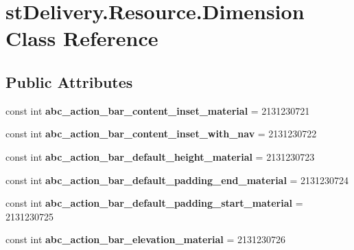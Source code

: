 \hypertarget{classst_delivery_1_1_resource_1_1_dimension}{}\section{st\+Delivery.\+Resource.\+Dimension Class Reference}
\label{classst_delivery_1_1_resource_1_1_dimension}
\subsection*{Public Attributes}
\begin{DoxyCompactItemize}
\item 
\mbox{\label{classst_delivery_1_1_resource_1_1_dimension_afbbbc7a6b7fefa2317bd42fb9382f283}} 
const int {\bfseries abc\+\_\+action\+\_\+bar\+\_\+content\+\_\+inset\+\_\+material} = 2131230721
\item 
\mbox{\label{classst_delivery_1_1_resource_1_1_dimension_a8b504eb3bcd5b40365ef4f6b5daa0acb}} 
const int {\bfseries abc\+\_\+action\+\_\+bar\+\_\+content\+\_\+inset\+\_\+with\+\_\+nav} = 2131230722
\item 
\mbox{\label{classst_delivery_1_1_resource_1_1_dimension_a805da6d1a549eac34fdc405e7fc84f34}} 
const int {\bfseries abc\+\_\+action\+\_\+bar\+\_\+default\+\_\+height\+\_\+material} = 2131230723
\item 
\mbox{\label{classst_delivery_1_1_resource_1_1_dimension_a496b13f8b3fff885f988d71196390f7c}} 
const int {\bfseries abc\+\_\+action\+\_\+bar\+\_\+default\+\_\+padding\+\_\+end\+\_\+material} = 2131230724
\item 
\mbox{\label{classst_delivery_1_1_resource_1_1_dimension_a4700acc907803c6da9cb9437f07fdafe}} 
const int {\bfseries abc\+\_\+action\+\_\+bar\+\_\+default\+\_\+padding\+\_\+start\+\_\+material} = 2131230725
\item 
\mbox{\label{classst_delivery_1_1_resource_1_1_dimension_a34bc512c37daadd52d59d09193eb69e9}} 
const int {\bfseries abc\+\_\+action\+\_\+bar\+\_\+elevation\+\_\+material} = 2131230726

\end{DoxyCompactItemize}
